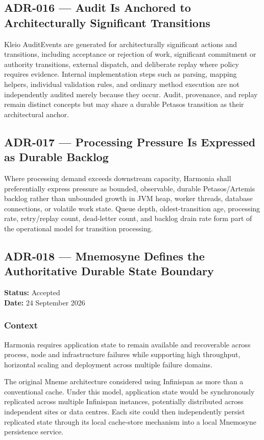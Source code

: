 \subsection{ADR-016 --- Audit Is Anchored to Architecturally Significant Transitions}
Kleio AuditEvents are generated for architecturally significant actions and transitions, including acceptance or rejection of work, significant commitment or authority transitions, external dispatch, and deliberate replay where policy requires evidence. Internal implementation steps such as parsing, mapping helpers, individual validation rules, and ordinary method execution are not independently audited merely because they occur. Audit, provenance, and replay remain distinct concepts but may share a durable Petasos transition as their architectural anchor.

\subsection{ADR-017 --- Processing Pressure Is Expressed as Durable Backlog}
Where processing demand exceeds downstream capacity, Harmonia shall preferentially express pressure as bounded, observable, durable Petasos/Artemis backlog rather than unbounded growth in JVM heap, worker threads, database connections, or volatile work state. Queue depth, oldest-transition age, processing rate, retry/replay count, dead-letter count, and backlog drain rate form part of the operational model for transition processing.

\subsection{ADR-018 --- Mnemosyne Defines the Authoritative Durable State Boundary}
\label{adr:018-mnemosyne-durable-state-boundary}

\textbf{Status:} Accepted\\
\textbf{Date:} 24 September 2026

\subsubsection{Context}

Harmonia requires application state to remain available and recoverable across process, node and infrastructure failures while supporting high throughput, horizontal scaling and deployment across multiple failure domains.

The original Mneme architecture considered using Infinispan as more than a conventional cache. Under this model, application state would be synchronously replicated across multiple Infinispan instances, potentially distributed across independent sites or data centres. Each site could then independently persist replicated state through its local cache-store mechanism into a local Mnemosyne persistence service.

